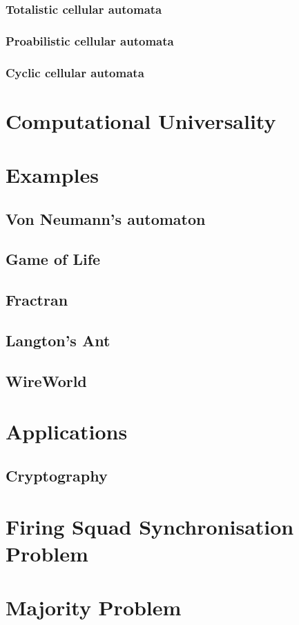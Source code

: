 \documentclass[11pt,a4paper]{article}
\begin{document}
    \subsubsection{Totalistic cellular automata}
    \subsubsection{Proabilistic cellular automata}
    \subsubsection{Cyclic cellular automata}

\section{Computational Universality}

\section{Examples}
    \subsection{Von Neumann's automaton}
    \subsection{Game of Life}
    \subsection{Fractran}
    \subsection{Langton's Ant}
    \subsection{WireWorld}
\section{Applications}
    \subsection{Cryptography}
\section{Firing Squad Synchronisation Problem}
\section{Majority Problem}


\end{document}
